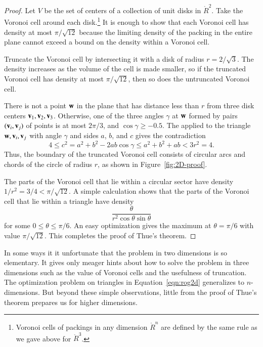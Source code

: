 \figOCULYIA %

\begin{proof}
Let $V$ be the set of centers of a collection of unit disks in
$\ring{R}^2$.  Take the Voronoi cell around each
disk.\footnote{Voronoi cells of packings in any dimension $\ring{R}^n$
  are defined by the same rule as we gave above for $\ring{R}^3$.}   It
is enough to show that each Voronoi cell has density at most
$\pi/\sqrt{12}$ because the limiting density of the packing in the entire plane cannot exceed
a bound on the density within a Voronoi cell.  


Truncate the Voronoi cell by intersecting it with a disk of radius
$r=2/\sqrt3$.   The density increases as the volume of the cell is made smaller,
so if the truncated Voronoi cell
has density at most $\pi/\sqrt{12}$, then so does the untruncated Voronoi cell.

There is not a point ${\mathbf w}$ in the plane that has distance  less than $r$
from three disk centers ${\mathbf v}_1,{\mathbf v}_2,{\mathbf v}_3$.  Otherwise, one of the three
angles $\gamma$ at ${\mathbf w}$ formed by pairs $({\mathbf v}_i,{\mathbf v}_j)$ of points
 is at most $2\pi/3$, and $\cos\gamma\ge -0.5$.
The  applied to the triangle ${\mathbf w},{\mathbf v}_i,{\mathbf v}_j$ with angle
$\gamma$ and sides $a$, $b$, and $c$ gives the contradiction
   \[ 
   4 \le c^2 = a^2 + b^2 - 2 a b \cos\gamma 
   \le a^2 + b^2 + a b < 3r^2 = 4.
   \] 
Thus, the boundary of the truncated Voronoi cell consists of circular
arcs and chords of the circle of radius $r$, as shown in Figure~\ref{fig:2D-proof}.

\figSENQMWT %

The parts of the Voronoi cell that lie within a circular sector have
density $1/r^2 = 3/4 < \pi/\sqrt{12}$.  A simple calculation shows
that the parts of the Voronoi cell that lie within a triangle have
density
   \begin{equation}\label{eqn:rog2d}
   \frac{\theta}{r^2 \cos\theta\sin\theta}
   \end{equation}
for some $0 \le \theta\le \pi/6$.  An easy optimization gives the maximum
at $\theta=\pi/6$ with value $\pi/\sqrt{12}$.  This completes the proof of Thue's theorem.
\end{proof}

In some ways it it unfortunate that the problem in two dimensions is
so elementary.  It gives only meager hints about how to solve the problem
in three dimensions such as the value of Voronoi cells
and the usefulness of truncation.  The optimization problem on
triangles in Equation~\ref{eqn:rog2d} generalizes to $n$-dimensions.
But beyond these simple observations,  little from the proof of Thue's
theorem prepares us for higher dimensions.

